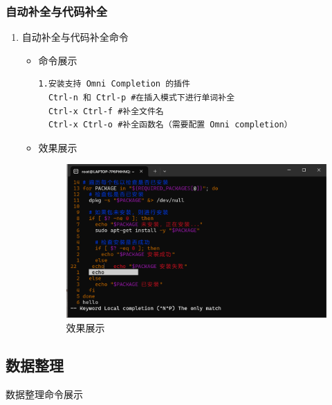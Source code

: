 \documentclass[UTF8]{ctexart}
\begin{document}
\subsubsection{自动补全与代码补全}

\begin{enumerate}
  \item 自动补全与代码补全命令
  \begin{itemize}
  \item 命令展示
  \begin{verbatim}
1.安装支持 Omni Completion 的插件
  Ctrl-n 和 Ctrl-p #在插入模式下进行单词补全
  Ctrl-x Ctrl-f #补全文件名
  Ctrl-x Ctrl-o #补全函数名（需要配置 Omni completion）   
  \end{verbatim}

  \item 效果展示
  \begin{figure}[H]
    \centering
    \includegraphics[width=\textwidth]{210} %
    \caption{效果展示}
  
  \end{figure}
\end{itemize}
\end{enumerate}





  \subsection{数据整理}
  {\color{blue}数据整理命令展示}
\end{document}

